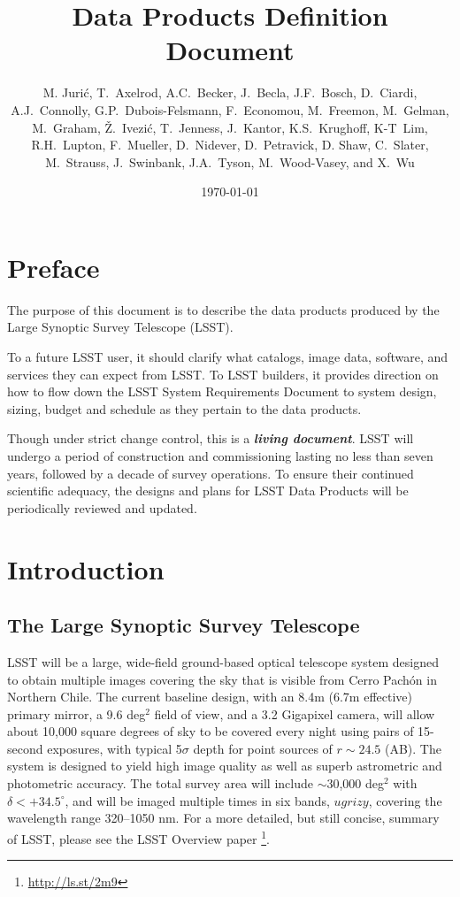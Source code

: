 \documentclass[SE,lsstdraft,toc]{lsstdoc}
\title[DPDD]{Data Products Definition Document}
\author{
M. Juri\'c,
T.~Axelrod, A.C.~Becker, J.~Becla, J.F.~Bosch, D.~Ciardi,
A.J.~Connolly,  G.P.~Dubois-Felsmann, F.~Economou, M.~Freemon,
M.~Gelman, M.~Graham, \v{Z}.~Ivezi\'c, T.~Jenness,  J.~Kantor, K.S.~Krughoff,
K-T~Lim,  R.H.~Lupton, F.~Mueller, D.~Nidever, D.~Petravick, D. Shaw,
C.~Slater, M.~Strauss, J.~Swinbank, J.A.~Tyson, M.~Wood-Vasey, and X.~Wu
}
\date{\today}
\begin{document}
\maketitle


\section*{Preface}

The purpose of this document is to describe the data products produced by the Large Synoptic Survey Telescope (LSST).

To a future LSST user, it should clarify what catalogs, image data, software, and services they can expect from LSST. To LSST builders, it provides direction on how to flow down the LSST System Requirements Document to system design, sizing, budget and schedule as they pertain to the data products.

Though under strict change control, this is a \textbf{\emph{living document}}. LSST will undergo a period of construction  and commissioning lasting no less than seven years, followed by a decade of survey operations. To ensure their continued scientific adequacy, the designs and plans for LSST Data Products will be periodically reviewed and updated.

\clearpage


\section{Introduction}

\subsection{The Large Synoptic Survey Telescope}

LSST will be a large, wide-field ground-based optical telescope system
designed to obtain multiple images covering the sky that is visible from Cerro Pach\'{o}n in Northern Chile. The current baseline design, with an 8.4m (6.7m effective) primary mirror, a 9.6 deg$^2$ field of view, and a 3.2 Gigapixel camera, will allow about 10,000 square degrees of sky to be covered every night using pairs of 15-second exposures, with typical 5$\sigma$ depth for point sources of $r\sim24.5$ (AB). The system is designed to yield high image quality as well as superb astrometric  and photometric accuracy. The total survey area will include $\sim$30,000 deg$^2$ with $\delta<+34.5^\circ$, and will be imaged multiple times in six bands, $ugrizy$, covering the wavelength range 320--1050 nm. For a more detailed, but still concise,
summary of LSST, please see the LSST Overview paper \citep{2008arXiv0805.2366I}\footnote{\url{http://ls.st/2m9}}.
\end{document}
